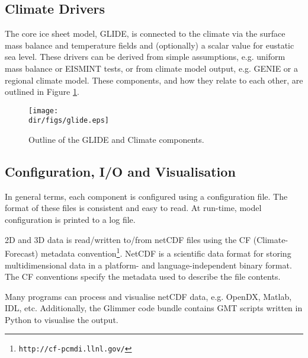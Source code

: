 \subsection{Climate Drivers}
\label{subsec:climdrive}
The core ice sheet model, GLIDE, is connected to the climate via the
surface mass balance and temperature fields and (optionally) a scalar
value for eustatic sea level. These drivers can be derived from simple
assumptions, e.g. uniform mass balance or EISMINT tests, or from
climate model output, e.g. GENIE or a regional climate model. These
components, and how they relate to each other, are outlined in Figure
\ref{ug.glide}. 
%
\begin{figure}[htbp]
 \begin{center}
   \texttt{[image: \\dir/figs/glide.eps]}
 \end{center}
 \caption{Outline of the GLIDE and Climate components.}
\label{ug.glide}
\end{figure}
%
\subsection{Configuration, I/O and Visualisation}
In general terms, each component is configured using a configuration
file. The format of these files is consistent and easy to read.
At run-time, model configuration is printed to a log file.  

2D and 3D data is read/written to/from netCDF files using the CF
(Climate-Forecast) metadata
convention\footnote{\texttt{http://cf-pcmdi.llnl.gov/}}.
NetCDF is a scientific data format for storing multidimensional data
in a platform- and language-independent binary format. The CF
conventions specify the metadata used to describe the file contents. 

Many programs can process and visualise netCDF data, e.g. OpenDX,
Matlab, IDL, etc. Additionally, the Glimmer code bundle contains GMT
scripts written in Python to visualise the output.

